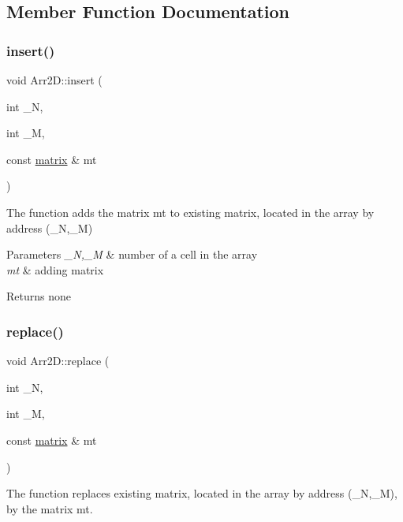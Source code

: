 \subsection{Member Function Documentation}
\mbox{\label{class_arr2_d_aee51dbd3ea4719ab1aa13ec474e46427}} 
\subsubsection{\texorpdfstring{insert()}{insert()}}
{\footnotesize\ttfamily void Arr2\+D\+::insert (\begin{DoxyParamCaption}\item[{int}]{\+\_\+N,  }\item[{int}]{\+\_\+M,  }\item[{const \mbox{\hyperlink{classmatrix}{matrix}} \&}]{mt }\end{DoxyParamCaption})}



The function adds the matrix mt to existing matrix, located in the array by address (\+\_\+N,\+\_\+M) 


\begin{DoxyParams}{Parameters}
{\em \+\_\+N,\+\_\+M} & number of a cell in the array \\
\hline
{\em mt} & adding matrix \\
\hline
\end{DoxyParams}
\begin{DoxyReturn}{Returns}
none 
\end{DoxyReturn}
\mbox{\label{class_arr2_d_acd1a53b083550ba287f6533876256b76}} 
\subsubsection{\texorpdfstring{replace()}{replace()}}
{\footnotesize\ttfamily void Arr2\+D\+::replace (\begin{DoxyParamCaption}\item[{int}]{\+\_\+N,  }\item[{int}]{\+\_\+M,  }\item[{const \mbox{\hyperlink{classmatrix}{matrix}} \&}]{mt }\end{DoxyParamCaption})}



The function replaces existing matrix, located in the array by address (\+\_\+N,\+\_\+M), by the matrix mt. 


